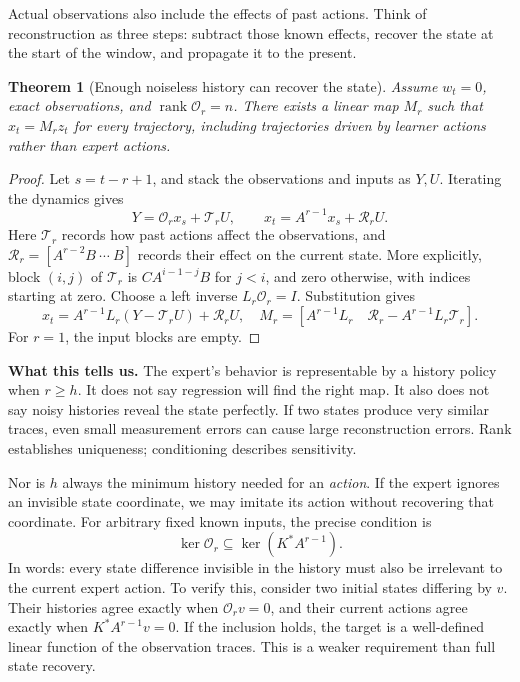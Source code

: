 \documentclass[12 pt]{article}        	%
\newtheorem{theorem}{Theorem}[section]
\theoremstyle{definition}
\DeclareMathOperator{\rank}{rank}
\begin{document}
Actual observations also include the effects of past actions. Think of reconstruction as three steps: subtract those known effects, recover the state at the start of the window, and propagate it to the present.

\begin{theorem}[Enough noiseless history can recover the state]\label{thm:recon}
Assume $w_t=0$, exact observations, and $\rank\mathcal O_r=n$. There exists a linear map $M_r$ such that $x_t=M_rz_t$ for every trajectory, including trajectories driven by learner actions rather than expert actions.
\end{theorem}
\begin{proof}
Let $s=t-r+1$, and stack the observations and inputs as $Y,U$. Iterating the dynamics gives
\[
Y=\mathcal O_rx_s+\mathcal T_rU,\qquad
x_t=A^{r-1}x_s+\mathcal R_rU.
\]
Here $\mathcal T_r$ records how past actions affect the observations, and
$\mathcal R_r=[A^{r-2}B\ \cdots\ B]$ records their effect on the current state. More explicitly, block $(i,j)$ of $\mathcal T_r$ is $CA^{i-1-j}B$ for $j<i$, and zero otherwise, with indices starting at zero. Choose a left inverse $L_r\mathcal O_r=I$. Substitution gives
\[
x_t=A^{r-1}L_r(Y-\mathcal T_rU)+\mathcal R_rU,
\quad
M_r=[A^{r-1}L_r\quad\mathcal R_r-A^{r-1}L_r\mathcal T_r].
\]
For $r=1$, the input blocks are empty.
\end{proof}

\textbf{What this tells us.} The expert's behavior is representable by a history policy when $r\ge h$. It does not say regression will find the right map. It also does not say noisy histories reveal the state perfectly. If two states produce very similar traces, even small measurement errors can cause large reconstruction errors. Rank establishes uniqueness; conditioning describes sensitivity.

Nor is $h$ always the minimum history needed for an \emph{action}. If the expert ignores an invisible state coordinate, we may imitate its action without recovering that coordinate. For arbitrary fixed known inputs, the precise condition is
\[
\ker\mathcal O_r\subseteq\ker(K^*A^{r-1}).
\]
In words: every state difference invisible in the history must also be irrelevant to the current expert action. To verify this, consider two initial states differing by $v$. Their histories agree exactly when $\mathcal O_rv=0$, and their current actions agree exactly when $K^*A^{r-1}v=0$. If the inclusion holds, the target is a well-defined linear function of the observation traces. This is a weaker requirement than full state recovery.
\end{document}
